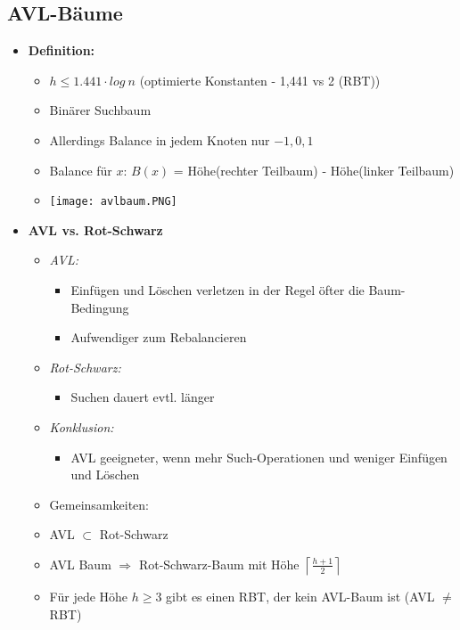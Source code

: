 \subsection{AVL-Bäume}
    \begin{itemize}
        \item \textbf{Definition:}
            \begin{itemize}
                \item $h \leq 1.441 \cdot log~n$ (optimierte Konstanten - 1,441 vs 2 (RBT))
                \item Binärer Suchbaum
                \item Allerdings Balance in jedem Knoten nur $-1,0,1$
                \item Balance für $x$: $B(x)$ = Höhe(rechter Teilbaum) - Höhe(linker Teilbaum)
                \item[] \texttt{[image: avlbaum.PNG]}
            \end{itemize}
        
\pagebreak

        \item \textbf{AVL vs. Rot-Schwarz}
            \begin{itemize}
                \item \textit{AVL:}
                    \begin{itemize}
                        \item Einfügen und Löschen verletzen in der Regel öfter die Baum-Bedingung
                        \item Aufwendiger zum Rebalancieren
                    \end{itemize}
                \item \textit{Rot-Schwarz:}
                    \begin{itemize}
                        \item Suchen dauert evtl. länger
                    \end{itemize}
                \item \textit{Konklusion:}
                    \begin{itemize}
                        \item AVL geeigneter, wenn mehr Such-Operationen und weniger Einfügen und Löschen
                    \end{itemize}
                \item Gemeinsamkeiten:
                    \item AVL $\subset$ Rot-Schwarz
                    \item AVL Baum $\Rightarrow$ Rot-Schwarz-Baum mit Höhe $\left \lceil \frac{h+1}{2} \right \rceil$
                    \item Für jede Höhe $h \geq 3$ gibt es einen RBT, der kein AVL-Baum ist (AVL $\neq$ RBT)
            \end{itemize}


\end{itemize}
